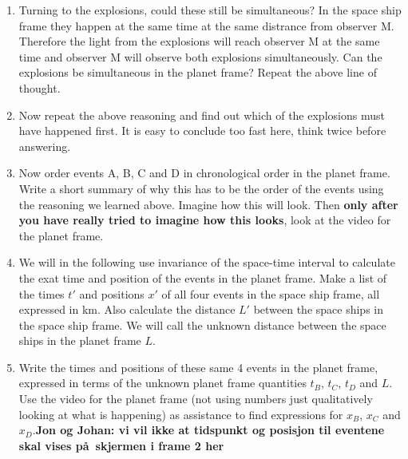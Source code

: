 {\begin{multicols}{2}
\begin{enumerate}
\item Turning to the explosions, could these still be simultaneous?
In the space ship frame they happen at the same time at the same
distrance from observer M. Therefore the light from the explosions
will reach observer M at the same time and observer M will observe
both explosions simultaneously. Can the explosions be simultaneous in
the planet frame? Repeat the above line of thought.

\item Now repeat the above reasoning and find out which of the
explosions must have happened first. It is easy to conclude too fast
here, think twice before answering.

\item Now order events A, B, C and D in chronological order in the
planet frame. Write a short summary of why this has to be the order of
the events using the reasoning we learned above. Imagine how this will
look. Then {\bf only after you
have really tried to imagine how this looks}, look at the video for
the planet frame.

\item We will in the following use invariance of the space-time interval to
calculate the exat time and position of the events in the planet
frame. Make a list of the times $t'$ and positions $x'$ of all four
events in the space ship frame, all expressed in km. Also calculate the distance $L'$
between the space ships in the space ship frame. We will call the
unknown distance between the space ships in the planet frame $L$.

\item Write the times and positions of these same 4 events in the
planet frame, expressed in terms of the unknown planet frame
quantities $t_B$, $t_C$, $t_D$ and $L$. Use the video for the
planet frame (not using numbers just qualitatively looking at what is happening) as assistance to find
expressions for $x_B$, $x_C$ and $x_D$.{\bf Jon og Johan: vi vil ikke
at tidspunkt og posisjon til eventene skal vises p\aa\  skjermen i frame 2
her}


\end{enumerate}
\end{multicols}}
